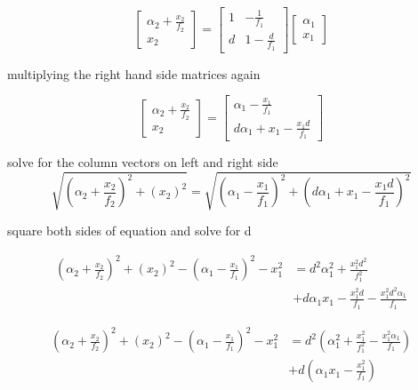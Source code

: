 \documentclass[main.tex]{subfiles}
\begin{document}
\begin{equation}
\begin{bmatrix}
    \alpha_2 + \frac{x_2}{f_2}\\
    x_2
\end{bmatrix}
=
\begin{bmatrix}
    1   & -\frac{1}{f_1} \\
    d   & 1 -\frac{d}{f_1}  
\end{bmatrix}
\begin{bmatrix}
    \alpha_{1} \\
    x_1
\end{bmatrix}
\end{equation}

multiplying the right hand side matrices again

\begin{equation}
\begin{bmatrix}
    \alpha_2 + \frac{x_2}{f_2}\\
    x_2
\end{bmatrix}
=
\begin{bmatrix}
    \alpha_1 - \frac{x_1}{f_1} \\
    d\alpha_1 + x_1 - \frac{x_1 d}{f_1}
\end{bmatrix}
\end{equation}

solve for the column vectors on left and right side\\

\begin{equation}
\sqrt{(\alpha_2 + \frac{x_2}{f_2})^2 + (x_2)^2} = \sqrt{(\alpha_1 - \frac{x_1}{f_1})^2 + (d\alpha_1 + x_1 - \frac{x_1 d}{f_1})^2}
\end{equation}

square both sides of equation and solve for d

\begin{equation}
\begin{aligned}
(\alpha_2 + \frac{x_2}{f_2})^2 + (x_2)^2 - (\alpha_1 - \frac{x_1}{f_1})^2 -x_1^2 & = d^2\alpha_1^2 + \frac{x_1^2 d^2}{f_1^2}\\ 
                                                                               & + d \alpha_1 x_1 - \frac{x_1^2 d}{f_1} - \frac{x_1^2 d^2 \alpha_1}{f_1}
\end{aligned}
\end{equation}

\begin{equation}
\begin{aligned}
(\alpha_2 + \frac{x_2}{f_2})^2 + (x_2)^2 - (\alpha_1 - \frac{x_1}{f_1})^2 -x_1^2 & = d^2(\alpha_1^2 + \frac{x_1^2}{f_1^2} - \frac{x_1^2\alpha_1}{f_1})\\ 
                                                                                 & + d(\alpha_1 x_1 - \frac{x_1^2}{f_1})
\end{aligned}
\end{equation}
\end{document}
